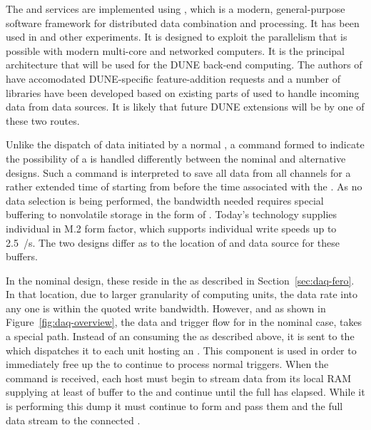The  and  services are implemented using
, which is a modern, general-purpose software framework for
distributed data combination and processing. 
It has been used in  and other experiments.
It is designed to exploit the parallelism that is possible with
modern multi-core and networked computers. 
It is the principal architecture that will be used for the DUNE 
back-end computing.
The authors of  have accomodated DUNE-specific feature-addition
requests and a number of libraries have been developed based on
existing parts of  used to handle incoming data from data
sources. 
It is likely that future DUNE extensions will be by one of these two
routes.

Unlike the dispatch of data initiated by a normal ,
a command formed to indicate the possibility of a  is
handled differently between the nominal and alternative designs. 
Such a command is interpreted to save all data from all channels
for a rather extended time of \snbtime starting from \snbpretime
before the time associated with the . 
As no data selection is being performed, the bandwidth needed requires
special buffering to nonvolatile storage in the form of . 
Today's technology supplies individual  in M.2 form factor,
which supports individual write speeds up to \SI{2.5}{\GB/\s}. 
The two designs differ as to the location of and data source for these
buffers.

In the nominal design, these  reside in the 
as described in Section~\ref{sec:daq-fero}. 
In that location, due to larger granularity of computing units, the
data rate into any one  is within the quoted write
bandwidth. 
However, and as shown in Figure~\ref{fig:daq-overview}, the data and
trigger flow for  in the nominal case, takes a special
path. 
Instead of an  consuming the  as
described above, it is sent to the  which dispatches
it to each  unit hosting an . 
This component is used in order to immediately free up the 
to continue to process normal triggers.
When the command is received, each host must begin to stream data from
its local RAM supplying at least \snbpretime of buffer to the
 and continue until the full \snbtime has elapsed. 
While it is performing this dump it must continue to form
 and pass them and the full data stream to the
connected .

